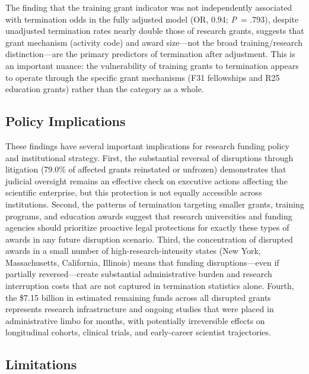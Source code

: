 \documentclass[10pt, letterpaper]{article}
\begin{document}
The finding that the training grant indicator was not independently associated with termination odds in the fully adjusted model (OR, 0.94; \textit{P}~= .793), despite unadjusted termination rates nearly double those of research grants, suggests that grant mechanism (activity code) and award size---not the broad training/research distinction---are the primary predictors of termination after adjustment. This is an important nuance: the vulnerability of training grants to termination appears to operate through the specific grant mechanisms (F31 fellowships and R25 education grants) rather than the category as a whole.

\subsection*{Policy Implications}

These findings have several important implications for research funding policy and institutional strategy. First, the substantial reversal of disruptions through litigation (79.0\% of affected grants reinstated or unfrozen) demonstrates that judicial oversight remains an effective check on executive actions affecting the scientific enterprise, but this protection is not equally accessible across institutions. Second, the patterns of termination targeting smaller grants, training programs, and education awards suggest that research universities and funding agencies should prioritize proactive legal protections for exactly these types of awards in any future disruption scenario. Third, the concentration of disrupted awards in a small number of high-research-intensity states (New York, Massachusetts, California, Illinois) means that funding disruptions---even if partially reversed---create substantial administrative burden and research interruption costs that are not captured in termination statistics alone.\cite{jones2023nih} Fourth, the \$7.15 billion in estimated remaining funds across all disrupted grants represents research infrastructure and ongoing studies that were placed in administrative limbo for months, with potentially irreversible effects on longitudinal cohorts, clinical trials, and early-career scientist trajectories.\cite{blume2018funding,teitelbaum2024diversity}

\subsection*{Limitations}
\end{document}
